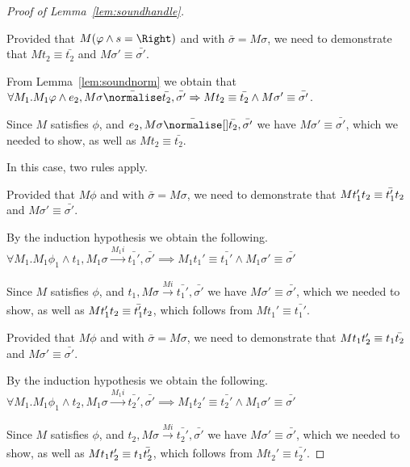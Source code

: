 \begin{proof}[Proof of Lemma~\ref{lem:soundhandle}]
{{    }
    {Provided that $M(\phi\wedge s=\Right)$ and  with $\bar{\sigma}=M\sigma$,
    we need to demonstrate that $M t_2\equiv \bar{t_2}$ and $M\sigma'\equiv \bar{\sigma'}$.

    From Lemma~\ref{lem:soundnorm} we obtain that $\forall M_1. M_1 \phi \land e_2,M\sigma\bar{\normalise}\bar{t_2},\bar{\sigma'}\implies M t_2\equiv\bar{t_2}\land M \sigma'\equiv\bar{\sigma'}$.

    Since $M$ satisfies $\phi$, and $e_2,M\sigma \bar{\normalise}[] \bar{t_2},\bar{\sigma'}$ we have $M\sigma'\equiv\bar{\sigma'}$,
    which we needed to show, as well as $M t_2 \equiv \bar{t_2}$.
    }
  }

  {
  In this case, two rules apply.\\
    {Provided that $M\phi$ and  with $\bar{\sigma}=M\sigma$,
    we need to demonstrate that $M t_1'\relax t_2\equiv \bar{t_1'}\relax t_2$ and $M\sigma'\equiv \bar{\sigma'}$.

    By the induction hypothesis we obtain the following.\\
    $\forall M_1 . M_1 \phi_1 \land t_1,M_1\sigma \xrightarrow[]{M_1 i} \bar{t_1'},\bar{\sigma'}\implies M_1 t_1'\equiv\bar{t_1'}\land M_1\sigma' \equiv \bar{\sigma'}$

    Since $M$ satisfies $\phi$, and $t_1,M\sigma\xrightarrow[]{M i} \bar{t_1'},\bar{\sigma'}$ we have $M\sigma'\equiv\bar{\sigma'}$,
    which we needed to show, as well as $M t_1'\relax t_2\equiv \bar{t_1'}\relax t_2$, which follows from $M t_1' \equiv \bar{t_1'}$.

    }
    {Provided that $M\phi$ and  with $\bar{\sigma}=M\sigma$,
    we need to demonstrate that $M t_1\relax t_2'\equiv t_1\relax \bar{t_2}$ and $M\sigma'\equiv \bar{\sigma'}$.

    By the induction hypothesis we obtain the following.\\
    $\forall M_1 . M_1 \phi_1 \land t_2,M_1\sigma \xrightarrow[]{M_1 i} \bar{t_2'},\bar{\sigma'}\implies M_1 t_2'\equiv\bar{t_2'}\land M_1\sigma' \equiv \bar{\sigma'}$

    Since $M$ satisfies $\phi$, and $t_2,M\sigma\xrightarrow[]{M i} \bar{t_2'},\bar{\sigma'}$ we have $M\sigma'\equiv\bar{\sigma'}$,
    which we needed to show, as well as $M t_1\relax t_2'\equiv t_1\relax \bar{t_2'}$, which follows from $M t_2' \equiv \bar{t_2'}$.}
  }


\end{proof}

